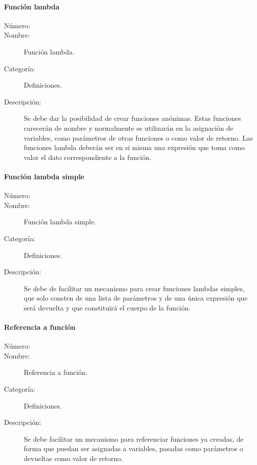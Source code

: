 \paragraph{Función lambda}
\begin{framed}
	\begin{description}
		\item [Número:] \cn
		\item [Nombre:] Función lambda.
		\item [Categoría:] Definiciones.
		\item [Descripción:] Se debe dar la posibilidad de crear funciones anónimas. Estas funciones carecerán de nombre y 
		normalmente se utilizarán en la asignación de variables, como parámetros de otras funciones o como valor de retorno. 
		Las funciones lambda deberán ser en si misma una expresión que toma como valor el dato correspondiente a la función. 
	\end{description}
\end{framed}

\paragraph{Función lambda simple}
\begin{framed}
	\begin{description}
		\item [Número:] \cn
		\item [Nombre:] Función lambda simple.
		\item [Categoría:] Definiciones.
		\item [Descripción:] Se debe de facilitar un mecanismo para crear funciones lambdas simples, que solo consten de una lista de parámetros
		y de una única expresión que será devuelta y que constituirá el cuerpo de la función. 
	\end{description}
\end{framed}

\paragraph{Referencia a función}
\begin{framed}
	\begin{description}
		\item [Número:] \cn
		\item [Nombre:] Referencia a función.
		\item [Categoría:] Definiciones.
		\item [Descripción:] Se debe facilitar un mecanismo para referenciar funciones ya creadas, de forma que puedan ser asignadas a variables, 
		pasadas como parámetros o devueltas como valor de retorno. 
	\end{description}
\end{framed}

